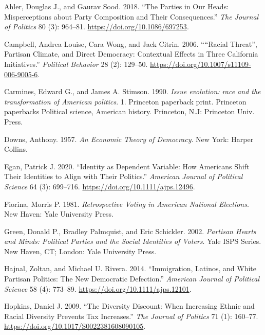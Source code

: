 \documentclass[
  12pt,
]{article}
\newlength{\cslhangindent}
\newlength{\cslentryspacingunit} %
\newenvironment{CSLReferences}[2] %
 {%
  \setlength{\parindent}{0pt}
  \ifodd #1
  \let\oldpar\par
  \def\par{\hangindent=\cslhangindent\oldpar}
  \fi
  \setlength{\parskip}{#2\cslentryspacingunit}
 }%
 {}
\begin{document}
\hypertarget{refs}{}
\begin{CSLReferences}{1}{0}
\leavevmode{}%
Ahler, Douglas J., and Gaurav Sood. 2018. {``The Parties in Our Heads:
Misperceptions about Party Composition and Their Consequences.''}
\emph{The Journal of Politics} 80 (3): 964--81.
\url{https://doi.org/10.1086/697253}.

\leavevmode{}%
Campbell, Andrea Louise, Cara Wong, and Jack Citrin. 2006. {``{``}Racial
Threat{''}, Partisan Climate, and Direct Democracy: Contextual Effects
in Three California Initiatives.''} \emph{Political Behavior} 28 (2):
129--50. \url{https://doi.org/10.1007/s11109-006-9005-6}.

\leavevmode{}%
Carmines, Edward G., and James A. Stimson. 1990. \emph{Issue evolution:
race and the transformation of American politics}. 1. Princeton
paperback print. Princeton paperbacks Political science, American
history. Princeton, N.J: Princeton Univ. Press.

\leavevmode{}%
Downs, Anthony. 1957. \emph{An Economic Theory of Democracy}. New York:
Harper Collins.

\leavevmode{}%
Egan, Patrick J. 2020. {``Identity as Dependent Variable: How Americans
Shift Their Identities to Align with Their Politics.''} \emph{American
Journal of Political Science} 64 (3): 699--716.
\url{https://doi.org/10.1111/ajps.12496}.

\leavevmode{}%
Fiorina, Morris P. 1981. \emph{Retrospective Voting in American National
Elections}. New Haven: Yale University Press.

\leavevmode{}%
Green, Donald P., Bradley Palmquist, and Eric Schickler. 2002.
\emph{Partisan Hearts and Minds: Political Parties and the Social
Identities of Voters}. Yale ISPS Series. New Haven, CT; London: Yale
University Press.

\leavevmode{}%
Hajnal, Zoltan, and Michael U. Rivera. 2014. {``Immigration, Latinos,
and White Partisan Politics: The New Democratic Defection.''}
\emph{American Journal of Political Science} 58 (4): 773--89.
\url{https://doi.org/10.1111/ajps.12101}.

\leavevmode{}%
Hopkins, Daniel J. 2009. {``The Diversity Discount: When Increasing
Ethnic and Racial Diversity Prevents Tax Increases.''} \emph{The Journal
of Politics} 71 (1): 160--77.
\url{https://doi.org/10.1017/S0022381608090105}.


\end{CSLReferences}
\end{document}
